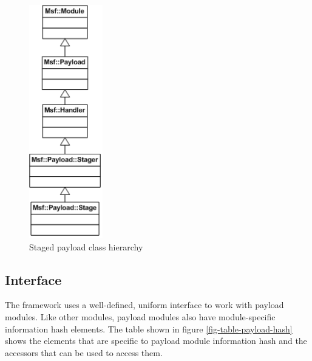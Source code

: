 \documentclass{report}
\begin{document}
\begin{figure}[h]
\begin{center}
\includegraphics[height=4.0in]{dev_guide_payload_hierarchy}
\caption{Staged payload class hierarchy} \label{fig-img-payload}
\end{center}
\end{figure}

        \subsection{Interface}

\par
The framework uses a well-defined, uniform interface to work with
payload modules.  Like other modules, payload modules also have
module-specific information hash elements.  The table shown in
figure \ref{fig-table-payload-hash} shows the elements that are
specific to payload module information hash and the accessors that
can be used to access them.
\end{document}
